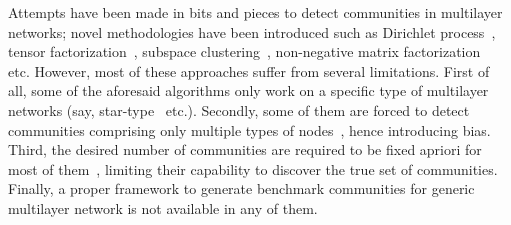 
Attempts have been made in bits and pieces to detect communities in multilayer networks; novel methodologies have been
introduced such as Dirichlet %
process~\cite{sun2014co}, tensor factorization~\cite{metafac}, subspace clustering~\cite{dong2014clustering},
non-negative matrix factorization~\cite{Cheng_kdd13} etc.
However, most of these approaches suffer from several limitations. First of all, some of the aforesaid algorithms only work
on a specific type of multilayer networks (say, star-type~\cite{sun2014co} etc.). Secondly, some of them are
forced to detect communities comprising only multiple types of nodes~\cite{metafac}, hence introducing bias. Third, the desired number of
communities are required to be fixed apriori for most of them~\cite{metafac,dong2014clustering},
limiting their capability to discover the true set of communities.
Finally, a proper framework to generate benchmark communities for generic multilayer network is not available in any of them.

%

